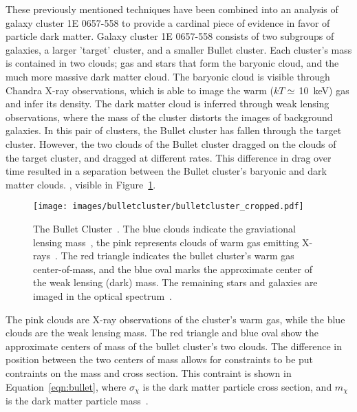     These previously mentioned techniques have been combined into an analysis of galaxy cluster 1E 0657-558 to provide a cardinal piece of evidence in favor of particle dark matter.
    Galaxy cluster 1E 0657-558 consists of two subgroups of galaxies, a larger 'target' cluster, and a smaller Bullet cluster.
    Each cluster's mass is contained in two clouds; gas and stars that form the baryonic cloud, and the much more massive dark matter cloud.
    The baryonic cloud is visible through Chandra X-ray observations, which is able to image the warm ($kT\simeq\,$\SI{10}{keV}) gas and infer its density.
    The dark matter cloud is inferred through weak lensing observations, where the mass of the cluster distorts the images of background galaxies.
    In this pair of clusters, the Bullet cluster has fallen through the target cluster.
    However, the two clouds of the Bullet cluster dragged on the clouds of the target cluster, and dragged at different rates.
    This difference in drag over time resulted in a separation between the Bullet cluster's baryonic and dark matter clouds.
    , visible in Figure~\ref{fig:bullet}.

    \begin{figure}[ht]
      \centering
      \texttt{[image: images/bulletcluster/bulletcluster\_cropped.pdf]}
      \caption[The Bullet Cluster]{
        The Bullet Cluster~\cite{bullet_cluster_combined_image}.
        The blue clouds indicate the graviational lensing mass~\cite{bullet_cluster}, the pink represents clouds of warm gas emitting X-rays~\cite{bullet_cluster_chandramap}.
        The red triangle indicates the bullet cluster's warm gas center-of-mass, and the blue oval marks the approximate center of the weak lensing (dark) mass.
        The remaining stars and galaxies are imaged in the optical spectrum~\cite{bullet_cluster_composite}.}
      \label{fig:bullet}
    \end{figure}
    
    The pink clouds are X-ray observations of the cluster's warm gas, while the blue clouds are the weak lensing mass.
    The red triangle and blue oval show the approximate centers of mass of the bullet cluster's two clouds.
    The difference in position between the two centers of mass allows for constraints to be put contraints on the mass and cross section.
    This contraint is shown in Equation~\ref{eqn:bullet}, where $\sigma_{\chi}$ is the dark matter particle cross section, and $m_{\chi}$ is the dark matter particle mass~\cite{bullet_cluster,bullet_cluster2}.
    
